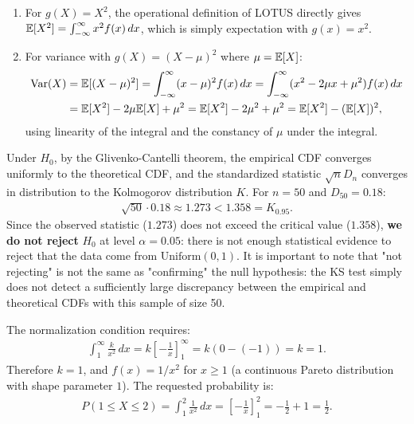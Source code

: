 \begin{solproblema}[prob:19f62fd]
	\begin{enumerate}
		\item For $g(X)=X^2$, the operational definition of LOTUS directly gives $\mathbb{E}[X^2]=\int_{-\infty}^{\infty}x^2f(x)\,dx$, which is simply expectation with $g(x)=x^2$.
		\item For variance with $g(X)=(X-\mu)^2$ where $\mu=\mathbb{E}[X]$:
		\begin{align*}
			\operatorname{Var}(X) &= \mathbb{E}[(X-\mu)^2] = \int_{-\infty}^{\infty}(x-\mu)^2f(x)\,dx = \int_{-\infty}^{\infty}(x^2-2\mu x+\mu^2)f(x)\,dx \\
			&= \mathbb{E}[X^2]-2\mu\mathbb{E}[X]+\mu^2 = \mathbb{E}[X^2]-2\mu^2+\mu^2 = \mathbb{E}[X^2]-(\mathbb{E}[X])^2,
		\end{align*}
		using linearity of the integral and the constancy of $\mu$ under the integral.
	\end{enumerate}
\end{solproblema}

\begin{solproblema}[prob:8ec7e10]
	Under $H_0$, by the Glivenko-Cantelli theorem, the empirical CDF converges uniformly to the theoretical CDF, and the standardized statistic $\sqrt{n}D_n$ converges in distribution to the Kolmogorov distribution $K$. For $n=50$ and $D_{50}=0.18$:
	\begin{align*}
		\sqrt{50}\cdot0.18 \approx 1.273 < 1.358 = K_{0.95}.
	\end{align*}
	Since the observed statistic ($1.273$) does not exceed the critical value ($1.358$), \textbf{we do not reject} $H_0$ at level $\alpha=0.05$: there is not enough statistical evidence to reject that the data come from $\text{Uniform}(0,1)$. It is important to note that "not rejecting" is not the same as "confirming" the null hypothesis: the KS test simply does not detect a sufficiently large discrepancy between the empirical and theoretical CDFs with this sample of size 50.
\end{solproblema}

\begin{solproblema}[prob:0d490fc]
	The normalization condition requires:
	\begin{align*}
		\int_{1}^{\infty} \frac{k}{x^2}\,dx = k\left[-\frac{1}{x}\right]_{1}^{\infty} = k(0-(-1)) = k = 1.
	\end{align*}
	Therefore $k=1$, and $f(x) = 1/x^2$ for $x\ge1$ (a continuous Pareto distribution with shape parameter $1$). The requested probability is:
	\begin{align*}
		P(1 \le X \le 2) = \int_{1}^{2} \frac{1}{x^2}\,dx = \left[-\frac{1}{x}\right]_{1}^{2} = -\frac{1}{2}+1 = \frac{1}{2}.
	\end{align*}
\end{solproblema}

